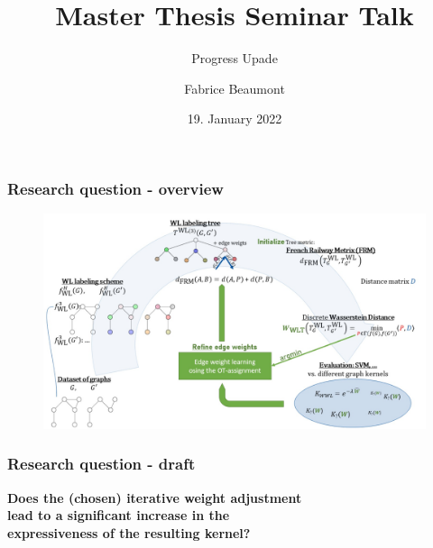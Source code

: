 

\title[MA Seminar Talk - Progress]{Master Thesis Seminar Talk}
\subtitle{Progress Upade}
\author[F. Beaumont]{Fabrice Beaumont}
\date{19. January 2022}



\begin{frame}
	\titlepage
\end{frame}

\begin{frame}
\frametitle{Research question - overview}
\begin{figure}[H]
	\centering
	\includegraphics[width=1.0\linewidth]{images/MasterThesisOverview}
	\label{fig:MasterThesisOverview}
\end{figure}
\end{frame}

\begin{frame}
\frametitle{Research question - draft}
	\begin{center}
		\textbf{Does the (chosen) iterative weight adjustment\newline\\
		lead to a significant increase in the\newline\\
		expressiveness of the resulting kernel?}
	\end{center}
\end{frame}


